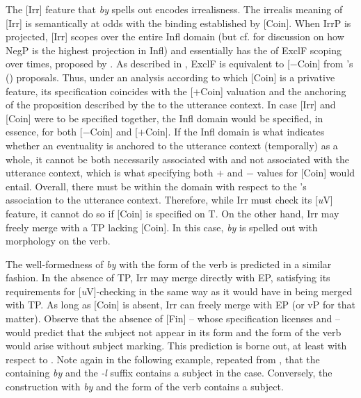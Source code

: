 \documentclass[output=paper,modfonts,newtxmath,hidelinks,]{langscibook}
\begin{document}
The [Irr] feature that \textit{by} spells out encodes irrealisness. The irrealis meaning of [Irr] is semantically at odds with the binding established by [Coin]. When IrrP is projected, [Irr] scopes over the entire Infl domain (but cf. \citealt{Cowper2010} for discussion on how NegP is the highest projection in Infl) and essentially has the  of ExclF scoping over times, proposed by \citet{Iatridou2000}. As described in , ExclF is equivalent to [$-$Coin] from \citeauthor{RitterWiltschko2005}'s (\citeyear{RitterWiltschko2005,RitterWiltschko2014}) proposals. Thus, under an analysis according to which [Coin] is a privative feature, its specification coincides with the [$+$Coin] valuation and the anchoring of the proposition described by the  to the utterance context. In case [Irr] and [Coin] were to be specified together, the Infl domain would be specified, in essence, for both [$-$Coin] and [$+$Coin]. If the Infl domain is what indicates whether an eventuality is anchored to the utterance context (temporally) as a whole, it cannot be both necessarily associated with and not associated with the utterance context, which is what specifying both $+$ and $-$ values for [Coin] would entail. Overall, there must be  within the domain with respect to the ’s association to the utterance context. Therefore, while Irr must check its [\textit{u}V] feature, it cannot do so if [Coin] is specified on T. On the other hand, Irr may freely merge with a TP lacking [Coin]. In this case, \textit{by} is spelled out with  morphology on the verb.\largerpage

The well-formedness of \textit{by} with the  form of the verb is predicted in a similar fashion. In the absence of TP, Irr may merge directly with EP, satisfying its requirements for [\textit{u}V]-checking in the same way as it would have in being merged with TP. As long as [Coin] is absent, Irr can freely merge with EP (or vP for that matter). Observe that the absence of [Fin] -- whose specification licenses   and  -- would predict that the subject not appear in its  form and the  form of the verb would arise without subject  marking. This prediction is borne out, at least with respect to . Note again in the following example, repeated from , that the  containing \textit{by} and the \textit{-l} suffix contains a subject in the  case. Conversely, the construction with \textit{by} and the  form of the verb contains a  subject. 
\end{document}
